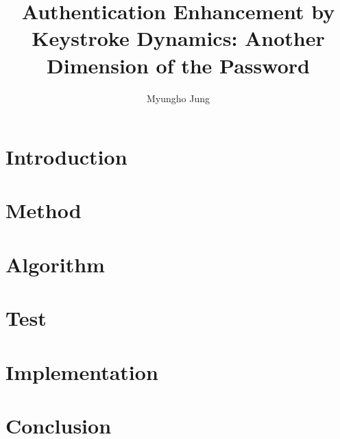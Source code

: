\documentclass[twocolumn,showpacs,%
  nofootinbib,aps,%
  eqsecnum,prd,notitlepage,showkeys,10pt]{revtex4-1}
\begin{document}
\title{Authentication Enhancement by Keystroke Dynamics: Another Dimension of the Password }
\author{Myungho Jung}

\begin{abstract}
\end{abstract}

\maketitle

\section{Introduction}


\section{Method}

\section{Algorithm}

\section{Test}

\section{Implementation}

\section{Conclusion}

%
%
\end{document}
